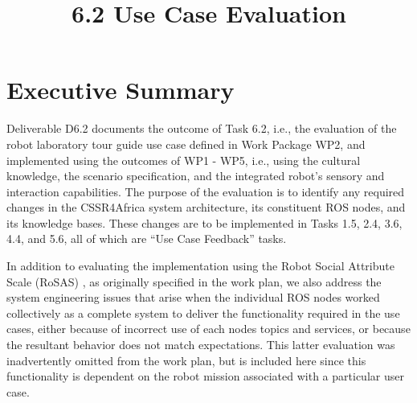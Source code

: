 \documentclass{CSSRforAfrica}
\begin{document}



\title{6.2  Use Case Evaluation}   





\maketitle
 

\section*{Executive Summary}
\label{executive_summary}
 
Deliverable D6.2 documents the outcome of Task 6.2, i.e., the  evaluation of the  robot laboratory tour guide use case defined in Work Package WP2, and implemented using the outcomes of WP1 - WP5, i.e., using the cultural knowledge, the scenario specification, and the integrated  robot's sensory and interaction capabilities. The purpose of the evaluation is to identify  any required changes in the CSSR4Africa system architecture,  its constituent ROS nodes, and its knowledge bases.  These changes  are to be implemented in Tasks  1.5, 2.4, 3.6, 4.4, and 5.6, all of which are ``Use Case Feedback'' tasks. 

In addition to evaluating the implementation using the Robot Social Attribute Scale (RoSAS) \cite{Carpinellaetal2017}, as originally specified in the work plan,  we also address the system engineering issues that arise when the  individual ROS nodes worked collectively as a complete system to deliver the  functionality required in the use cases, either because of incorrect use of each nodes topics and services, or because the resultant behavior does not match expectations.   This latter evaluation was inadvertently omitted from the work plan, but is included here since this functionality is dependent on the robot mission associated with a particular user case.
\end{document}
